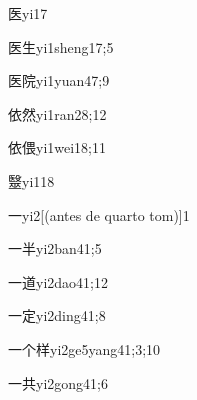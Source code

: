 \begin{verbete}{医}{yi1}{7}
\end{verbete}

\begin{verbete}{医生}{yi1sheng1}{7;5}
\end{verbete}

\begin{verbete}{医院}{yi1yuan4}{7;9}
\end{verbete}

\begin{verbete}{依然}{yi1ran2}{8;12}
\end{verbete}

\begin{verbete}{依偎}{yi1wei1}{8;11}
\end{verbete}

\begin{verbete}{毉}{yi1}{18}
\end{verbete}

\begin{verbete}{一}{yi2}[(antes de quarto tom)]{1}
\end{verbete}

\begin{verbete}{一半}{yi2ban4}{1;5}
\end{verbete}

\begin{verbete}{一道}{yi2dao4}{1;12}
\end{verbete}

\begin{verbete}{一定}{yi2ding4}{1;8}
\end{verbete}

\begin{verbete}{一个样}{yi2ge5yang4}{1;3;10}
\end{verbete}

\begin{verbete}{一共}{yi2gong4}{1;6}
\end{verbete}

